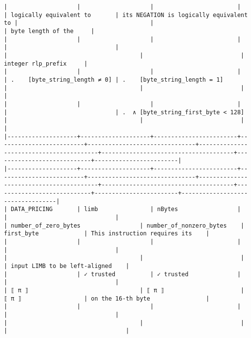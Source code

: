 \documentclass[varwidth=\maxdimen,margin=0.5cm,multi={verbatim}]{standalone}
\begin{document}
\begin{verbatim}
|                    |                    |                        |                         | logically equivalent to       | its NEGATION is logically equivalent to |                                      |                            | byte length of the     |
|                    |                    |                        |                         |                               |                                         |                                      |                            | integer rlp_prefix     |
|                    |                    |                        |                         | .    [byte_string_length ≠ 0] | .    [byte_string_length = 1]           |                                      |                            |                        |
|                    |                    |                        |                         |                               | .  ∧ [byte_string_first_byte < 128]     |                                      |                            |                        |
|--------------------+--------------------+------------------------+-------------------------+-------------------------------+-----------------------------------------+--------------------------------------+----------------------------+------------------------|
|--------------------+--------------------+------------------------+-------------------------+-------------------------------+-----------------------------------------+--------------------------------------+----------------------------+------------------------+----------------------------------|
| DATA_PRICING       | limb               | nBytes                 |                         |                               |                                         | number_of_zero_bytes                 | number_of_nonzero_bytes    | first_byte             | This instruction requires its    |
|                    |                    |                        |                         |                               |                                         |                                      |                            |                        | input LIMB to be left-aligned    |
|                    | ✓ trusted          | ✓ trusted              |                         |                               |                                         | ⟦ π ⟧                                | ⟦ π ⟧                      | ⟦ π ⟧                  | on the 16-th byte                |
|                    |                    |                        |                         |                               |                                         |                                      |                            |                        |                                  |

\end{verbatim}
\end{document}

